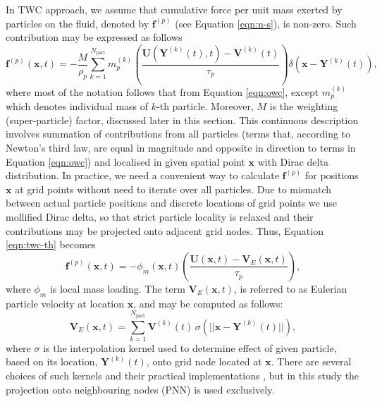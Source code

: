 \documentclass{pracamgren}
\begin{document}
In TWC approach, we assume that cumulative force per unit mass exerted by particles on the fluid, denoted by $\mathbf{f}^{(p)}$ (see Equation \ref{eqn:n-s}), is non-zero.
Such contribution may be expressed as follows \parencite{Bosse2006,Monchaux2017,Rosa2022}
\begin{equation}
\mathbf{f}^{(p)}(\mathbf{x}, t) = - \frac{M}{\rho_{p}} \sum_{k=1}^{N_{\text{part}}} m^{(k)}_{p} \left( \frac{ \mathbf{U}(\mathbf{Y}^{(k)}(t), t) - \mathbf{V}^{(k)}(t) }{\tau_{p}} \right) \delta \left( \mathbf{x} - \mathbf{Y}^{(k)}(t) \right) ,
\label{eqn:twc-th}
\end{equation}
where most of the notation follows that from Equation \ref{eqn:owc}, except $m^{(k)}_{p}$ which denotes individual mass of $k$-th particle.
Moreover, $M$ is the weighting (super-particle) factor, discussed later in this section.
This continuous description involves summation of contributions from all particles (terms that, according to Newton's third law, are equal in magnitude and opposite in direction to terms in Equation \ref{eqn:owc}) and localised in given spatial point $\mathbf{x}$ with Dirac delta distribution.
In practice, we need a convenient way to calculate $\mathbf{f}^{(p)}$ for positions $\mathbf{x}$ at grid points without need to iterate over all particles.
Due to mismatch between actual particle positions and discrete locations of grid points we use mollified Dirac delta, so that strict particle locality is relaxed and their contributions may be projected onto adjacent grid nodes.
Thus, Equation \ref{eqn:twc-th} becomes
\begin{equation}
\mathbf{f}^{(p)}(\mathbf{x}, t) = - \phi_{m}(\mathbf{x}, t) \left( \frac{ \mathbf{U}(\mathbf{x}, t) - \mathbf{V}_{E}(\mathbf{x}, t)}{\tau_{p}} \right) ,
\label{eqn:twc-px}
\end{equation}  
where $\phi_{m}$ is local mass loading. 
The term $\mathbf{V}_{E}(\mathbf{x}, t)$, is referred to as Eulerian particle velocity at location $\mathbf{x}$, and may be computed as follows:
\begin{equation}
\mathbf{V}_{E}(\mathbf{x}, t) = \sum_{k=1}^{N_{\text{part}}} \mathbf{V}^{(k)}(t) \, \sigma(|| \mathbf{x} - \mathbf{Y}^{(k)}(t) ||) ,
\label{eqn:twc-ve}
\end{equation}
where $\sigma$ is the interpolation kernel used to determine effect of given particle, based on its location, $\mathbf{Y}^{(k)}(t)$, onto grid node located at $\mathbf{x}$.
There are several choices of such kernels and their practical implementations \parencite{Garg2007}, but in this study the projection onto neighbouring nodes (PNN) is used exclusively.
\end{document}
